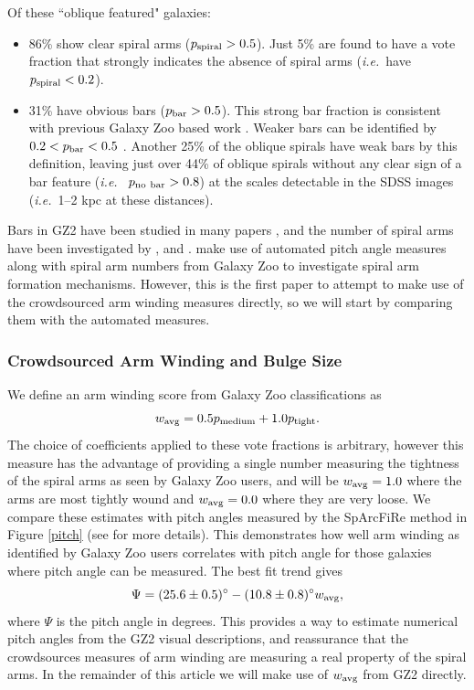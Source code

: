 \documentclass[usenatbib]{mn2e}
\newcommand{\ie}{{\it i.e.}}
\newcommand{\be}{\begin{equation}}
\newcommand{\ee}{\end{equation}}
\begin{document}
 Of these ``oblique featured" galaxies: 
\begin{itemize}
\item {86}\% show clear spiral arms ($p_{\rm spiral} > 0.5$). Just {5\%} are found to have a vote fraction that strongly indicates the absence of spiral arms (\ie ~have $p_{\rm spiral}<0.2$). 
\item {31}\% have obvious bars ($p_{\rm bar}>0.5$). This strong bar fraction is consistent with previous Galaxy Zoo based work \citep[e.g.][]{Masters2011, Masters2012}. Weaker bars can be identified by $0.2<p_{\rm bar}<0.5$ \citep[e.g.][]{Skibba2012,Willett2013,Kruk2018}. Another {25}\% of the oblique spirals have weak bars by this definition, leaving just over {44\%} of oblique spirals without any clear sign of a bar feature (\ie~ $p_{\rm no~bar}>0.8$) at the scales detectable in the SDSS images (\ie ~1--2 kpc at these distances). 
\end{itemize}

Bars in GZ2 have been studied in many papers \citep[e.g.][]{Masters2011, Masters2012, Skibba2012, Cheung2013, Cheung2015, Galloway2015, Kruk2017, Kruk2018}, and the number of spiral arms have been investigated by \citet{Willett2015}, \citet{Hart2016} and \citet{Hart2017a}. \citet{Hart2017b,Hart2018} make use of automated pitch angle measures along with spiral arm numbers from Galaxy Zoo to investigate spiral arm formation mechanisms. However, this is the first paper to attempt to make use of the crowdsourced arm winding measures directly, so we will start by comparing them with the automated measures. 

\subsubsection{Crowdsourced Arm Winding and Bulge Size}

We define an arm winding score from Galaxy Zoo classifications as
\be
\label{eqn:winding}
w_{\rm avg} =  0.5p_{\rm medium} + 1.0p_{\rm tight}.
\ee
The choice of coefficients applied to these vote fractions is arbitrary, however this measure has the advantage of providing a single number measuring the tightness of the spiral arms as seen by Galaxy Zoo users, and will be $w_{\rm avg} = 1.0$ where the arms are most tightly wound and $w_{\rm avg} = 0.0$ where they are very loose. We compare these estimates with pitch angles measured by the SpArcFiRe method \citep{DavisHayes2014} in Figure \ref{pitch} (see \citealt{Hart2017b} for more details). This demonstrates how well arm winding as identified by Galaxy Zoo users correlates with pitch angle for those galaxies where pitch angle can be measured. The best fit trend gives 
\be
\label{eqn:pitch}
\Psi =  (25.6\pm0.5)^\circ - (10.8\pm0.8)^\circ w_{\rm avg}, 
\ee
where $\Psi$ is the pitch angle in degrees. This provides a way to estimate numerical pitch angles from the GZ2 visual descriptions, and reassurance that the crowdsources measures of arm winding are measuring a real property of the spiral arms. In the remainder of this article we will make use of $w_{\rm avg}$ from GZ2 directly.  
\end{document}
